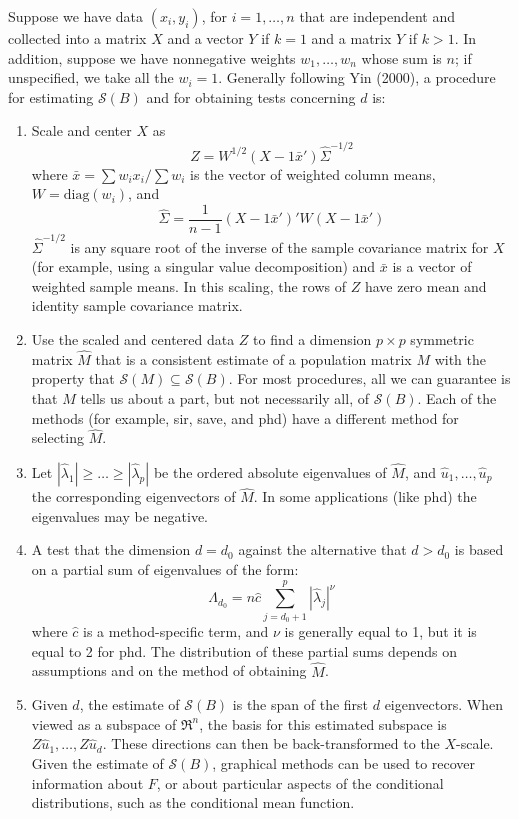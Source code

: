 \documentclass{article}
\newcommand{\sir}{{\sffamily sir}}
\newcommand{\save}{{\sffamily save}}
\newcommand{\phd}{{\sffamily phd}}
\renewcommand{\span}{{\mathcal S}}
\begin{document}
Suppose we have data $(x_i,y_i)$, for $i=1,\ldots,n$ that are
independent and collected into a matrix $X$ and a vector $Y$ if
$k=1$ and a matrix $Y$ if $k>1$.  In addition, suppose we have
nonnegative weights $w_1,\ldots,w_n$ whose sum is $n$;
 if unspecified, we take all the $w_i=1$.  Generally following Yin
(2000), a procedure for estimating $\span(B)$ and for obtaining
tests concerning $d$ is:
\begin{enumerate}
    \item Scale and center $X$ as
    \[
    Z =
    W^{1/2}(X - 1\bar{x}') \hat{\Sigma}^{-1/2}
    \]
    where $\bar{x} = \sum w_ix_i/\sum w_i$ is the vector of weighted column
    means, $W = \mathrm{diag}(w_i)$, and
    \[
    \hat{\Sigma} = \frac{1}{n -1} (X - 1\bar{x}')'W(X - 1\bar{x}')
    \]
    $\hat{\Sigma}^{-1/2}$ is any square root of the inverse of the
    sample covariance matrix for $X$ (for example, using a singular
    value decomposition) and $\bar{x}$ is a vector of weighted
    sample means.  In this
    scaling, the rows of $Z$ have zero mean and identity sample covariance
    matrix.
    \item
    Use the scaled and centered data $Z$ to find a
    dimension $p \times p$ symmetric
    matrix $\hat{M}$ that is a consistent
    estimate of a population matrix $M$ with the property that $\span(M)
    \subseteq \span(B)$.  For most procedures, all we can guarantee is
    that $M$ tells us about a part, but not necessarily all, of
    $\span(B)$.  Each of the methods (for example, \sir, \save, and
    \phd) have a different method for selecting $\hat{M}$.
    \item
    Let $|\hat{\lambda}_1|\geq \ldots \geq |\hat{\lambda}_p|$ be the
    ordered absolute eigenvalues
    of $\hat{M}$, and $\hat{u}_1,\ldots,\hat{u}_p$  the
    corresponding eigenvectors of $\hat{M}$.
    In some applications (like \phd) the eigenvalues may be negative.
    \item
    A test that the dimension $d=d_0$  against the alternative that $d >
    d_0$ is based on a partial sum of eigenvalues of the form:
    \[
    \Lambda_{d_0} = n \hat{c} \sum_{j=d_0+1}^p |\hat{\lambda}_j|^{\nu}
    \]
    where $\hat{c}$ is a method-specific term, and $\nu$ is generally
    equal to 1, but it is equal to 2 for \phd.
    The distribution of these partial sums depends on assumptions and on
    the method of obtaining $\hat{M}$.
    \item
    Given $d$, the estimate of $\span(B)$ is the span of the first
    $d$ eigenvectors.  When viewed as a subspace of $\Re^n$, the basis
    for this estimated subspace is
    $Z\hat{u}_1,\ldots,Z\hat{u}_d$.  These
    directions can then be back-transformed to the $X$-scale.  Given the
    estimate of $\span(B)$, graphical methods can be used to recover
    information about $F$, or about particular aspects of the conditional
    distributions, such as the conditional mean function.
\end{enumerate}
\end{document}
